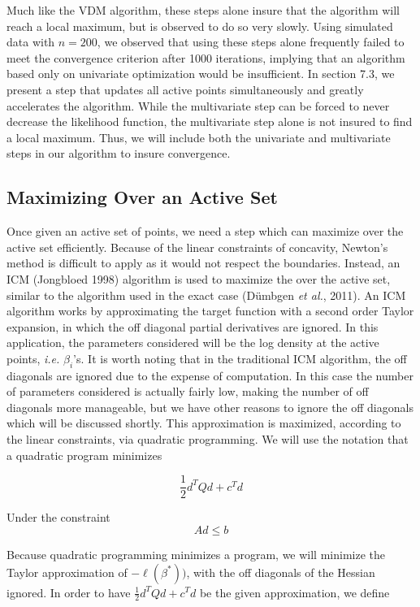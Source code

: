 \documentclass[10pt]{article}
\begin{document}
	Much like the VDM algorithm, these steps alone insure that the algorithm will reach a local maximum, but is observed to do so very slowly. Using simulated data with $n = 200$, we observed that using these steps alone frequently failed to meet the convergence criterion after 1000 iterations, implying that an algorithm based only on univariate optimization would be insufficient. In section 7.3, we present a step that updates all active points simultaneously and greatly accelerates the algorithm. While the multivariate step can be forced to never decrease the likelihood function, the multivariate step alone is not insured to find a local maximum. Thus, we will include both the univariate and multivariate steps in our algorithm to insure convergence. 
	
	{\subsection{Maximizing Over an Active Set} }
	
	Once given an active set of points, we need a step which can  maximize over the active set efficiently. Because of the linear constraints of concavity, Newton's method is difficult to apply as it would not respect the boundaries. Instead, an ICM (Jongbloed 1998) algorithm is used to maximize the over the active set, similar to the algorithm used in the exact case (D\"umbgen \emph{et al.}, 2011). An ICM algorithm works by approximating the target function with a second order Taylor expansion, in which the off diagonal partial derivatives are ignored. In this application, the parameters considered will be the log density at the active points, \emph{i.e.} $\beta_i$'s. It is worth noting that in the traditional ICM algorithm, the off diagonals are ignored due to the expense of computation. In this case the number of parameters considered  is actually fairly low, making the number of off diagonals more manageable, but we have other reasons to ignore the off diagonals which will be discussed shortly. This approximation is maximized, according to the linear constraints, via quadratic programming. We will use the notation that a quadratic program minimizes
	
	\[ \frac{1}{2} d^T Q d + c^T d
	\]
	
	Under the constraint \[ A d \leq b\]
	
	Because quadratic programming minimizes a program, we will minimize the Taylor approximation of $-\ell(\beta^*))$, with the off diagonals of the Hessian ignored. In order to have $\frac{1}{2} d^T Q d + c^T d$ be the given approximation, we define
	
\end{document}
